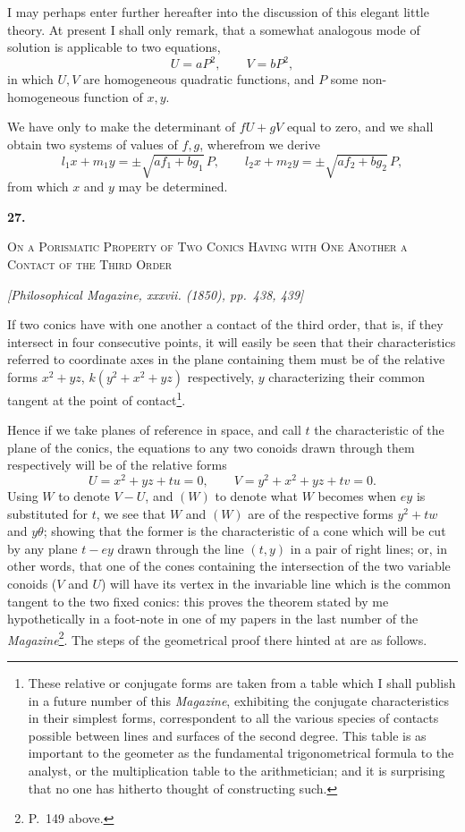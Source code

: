 \documentclass[11pt]{article}
\newcommand{\paperhead}[3]{%
  \clearpage
  \begin{center}
  {\Large\bfseries #1.}\par\vspace{0.85em}
  {\large\scshape #2}\par\vspace{0.6em}
  {\itshape [#3]}\par
  \end{center}\vspace{0.4em}}
\newcommand{\sourcepage}[1]{\marginpar{\scriptsize p.~#1}}
\begin{document}
{{I may perhaps enter further hereafter into the discussion of this elegant little theory. At present I shall only remark, that a somewhat analogous mode of solution is applicable to two equations,
\[
 U=aP^2,\qquad V=bP^2,
\]
in which $U,V$ are homogeneous quadratic functions, and $P$ some non-homogeneous function of $x,y$.

We have only to make the determinant of $fU+gV$ equal to zero, and we shall obtain two systems of values of $f,g$, wherefrom we derive
\[
 l_1x+m_1y=\pm\sqrt{af_1+bg_1}\,P,
 \qquad
 l_2x+m_2y=\pm\sqrt{af_2+bg_2}\,P,
\]
from which $x$ and $y$ may be determined.

\paperhead{27}{On a Porismatic Property of Two Conics Having with One Another a Contact of the Third Order}{Philosophical Magazine, xxxvii. (1850), pp.~438, 439}

\sourcepage{155}
If two conics have with one another a contact of the third order, that is, if they intersect in four consecutive points, it will easily be seen that their characteristics referred to coordinate axes in the plane containing them must be of the relative forms $x^2+yz$, $k(y^2+x^2+yz)$ respectively, $y$ characterizing their common tangent at the point of contact\footnote{These relative or conjugate forms are taken from a table which I shall publish in a future number of this \emph{Magazine}, exhibiting the conjugate characteristics in their simplest forms, correspondent to all the various species of contacts possible between lines and surfaces of the second degree. This table is as important to the geometer as the fundamental trigonometrical formula to the analyst, or the multiplication table to the arithmetician; and it is surprising that no one has hitherto thought of constructing such.}.

Hence if we take planes of reference in space, and call $t$ the characteristic of the plane of the conics, the equations to any two conoids drawn through them respectively will be of the relative forms
\[
 U=x^2+yz+tu=0,
 \qquad
 V=y^2+x^2+yz+tv=0.
\]
Using $W$ to denote $V-U$, and $(W)$ to denote what $W$ becomes when $ey$ is substituted for $t$, we see that $W$ and $(W)$ are of the respective forms $y^2+tw$ and $y\theta$; showing that the former is the characteristic of a cone which will be cut by any plane $t-ey$ drawn through the line $(t,y)$ in a pair of right lines; or, in other words, that one of the cones containing the intersection of the two variable conoids ($V$ and $U$) will have its vertex in the invariable line which is the common tangent to the two fixed conics: this proves the theorem stated by me hypothetically in a foot-note in one of my papers in the last number of the \emph{Magazine}\footnote{P.~149 above.}. The steps of the geometrical proof there hinted at are as follows.

}}
\end{document}
